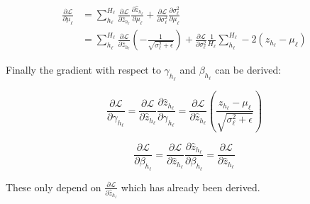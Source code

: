 \begin{equation}
\begin{aligned}
\frac{\partial \mathcal{L}}{\partial \mu_\ell} &= \sum_{h_\ell}^{H_\ell} \frac{\partial \mathcal{L}}{\partial \hat{z}_{h_\ell}} \frac{\partial \hat{z}_{h_\ell}}{\partial \mu_\ell} + \frac{\partial \mathcal{L}}{\partial \sigma_{\ell}^2} \frac{\partial \sigma_\ell^2}{\partial \mu_\ell} \\
&= \sum_{h_\ell}^{H_\ell} \frac{\partial \mathcal{L}}{\partial \hat{z}_{h_\ell}} \left(- \frac{1}{\sqrt{\sigma_\ell^2 + \epsilon}}\right) + \frac{\partial \mathcal{L}}{\partial \sigma_{\ell}^2} \frac{1}{H_\ell} \sum_{h_\ell}^{H_\ell} -2 \left(z_{h_\ell} - \mu_\ell\right)
\end{aligned}
\end{equation}

Finally the gradient with respect to $\gamma_{h_\ell}$ and $\beta_{h_\ell}$ can be derived:

\begin{equation}
\frac{\partial \mathcal{L}}{\partial \gamma_{h_\ell}} = \frac{\partial \mathcal{L}}{\partial \hat{z}_{h_\ell}} \frac{\partial \hat{z}_{h_\ell}}{\partial \gamma_{h_\ell}} = \frac{\partial \mathcal{L}}{\partial \hat{z}_{h_\ell}} \left(\frac{z_{h_\ell} - \mu_\ell}{\sqrt{\sigma_\ell^2 + \epsilon}}\right)
\end{equation}

\begin{equation}
\frac{\partial \mathcal{L}}{\partial \beta_{h_\ell}} = \frac{\partial \mathcal{L}}{\partial \hat{z}_{h_\ell}} \frac{\partial \hat{z}_{h_\ell}}{\partial \beta_{h_\ell}} = \frac{\partial \mathcal{L}}{\partial \hat{z}_{h_\ell}}
\end{equation}

These only depend on $\frac{\partial \mathcal{L}}{\partial \hat{z}_{h_\ell}}$ which has already been derived.